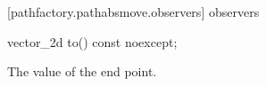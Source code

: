  [pathfactory.pathabsmove.observers]{ observers}

\begin{itemdecl}
    vector_2d to() const noexcept;
\end{itemdecl}
\begin{itemdescr}
	\pnum
	\returns
	The value of the end point.
\end{itemdescr}
